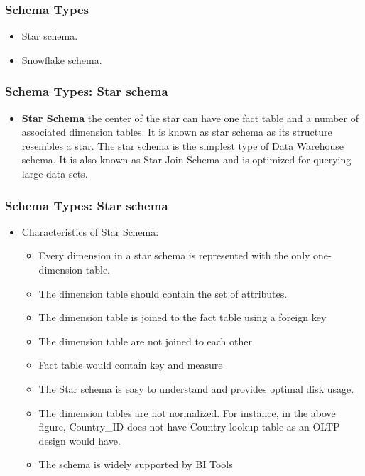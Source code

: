 \VideoClassification[column=1, colour=blue]

\begin{frame}
\frametitle{Schema Types}
	\begin{itemize}[<+->]
		\item Star schema.
		\item Snowflake schema.
	\end{itemize}
	
\end{frame}
\begin{frame}
    \frametitle{Schema Types: Star schema}
			\begin{itemize}
				\item \textbf{Star Schema} the center of the star can have one fact table and a number of associated dimension tables. It is known as star schema as its structure resembles a star. The star schema is the simplest type of Data Warehouse schema. It is also known as Star Join Schema and is optimized for querying large data sets.
			\end{itemize}
\end{frame}
\begin{frame}
\frametitle{Schema Types: Star schema}
\begin{itemize}
	\item Characteristics of Star Schema:
	\begin{itemize}
		\item Every dimension in a star schema is represented with the only one-dimension table.
		\item The dimension table should contain the set of attributes.
		\item The dimension table is joined to the fact table using a foreign key
		\item The dimension table are not joined to each other
		\item Fact table would contain key and measure
		\item The Star schema is easy to understand and provides optimal disk usage.
		\item The dimension tables are not normalized. For instance, in the above figure, Country\_ID does not have Country lookup table as an OLTP design would have.
		\item The schema is widely supported by BI Tools
	\end{itemize}
\end{itemize}
\end{frame}
